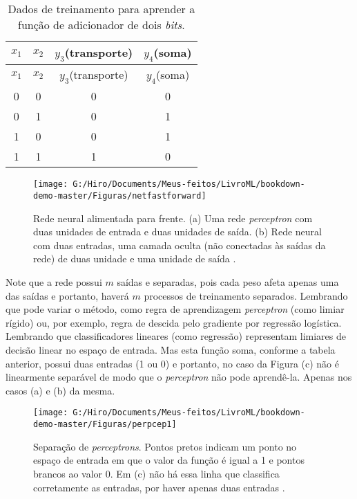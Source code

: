 \documentclass[
  openany]{book}
\begin{document}
\begin{longtable}[]{@{}cccc@{}}
\caption{\label{tab:tabredepercep} Dados de treinamento para aprender a função de adicionador de dois \emph{bits}.}\tabularnewline
\toprule
\(x_1\) & \(x_2\) & \(y_3\)(transporte) & \(y_4\)(soma)\tabularnewline
\midrule
\endfirsthead
\toprule
\(x_1\) & \(x_2\) & \(y_3\)(transporte) & \(y_4\)(soma)\tabularnewline
\midrule
\endhead
0 & 0 & 0 & 0\tabularnewline
0 & 1 & 0 & 1\tabularnewline
1 & 0 & 0 & 1\tabularnewline
1 & 1 & 1 & 0\tabularnewline
\bottomrule
\end{longtable}

\begin{figure}

{\centering \texttt{[image: G:/Hiro/Documents/Meus-feitos/LivroML/bookdown-demo-master/Figuras/netfastforward]} 

}

\caption{Rede neural alimentada para frente. (a) Uma rede \emph{perceptron} com duas unidades de entrada e duas unidades de saída. (b) Rede neural com duas entradas, uma camada oculta (não conectadas às saídas da rede) de duas unidade e uma unidade de saída \citep{russel2004inteligencia}.}\label{fig:netfastforward}
\end{figure}



Note que a rede possui \(m\) saídas e separadas, pois cada peso afeta apenas uma das saídas e portanto, haverá \(m\) processos de treinamento separados. Lembrando que pode variar o método, como regra de aprendizagem \emph{perceptron} (como limiar rígido) ou, por exemplo, regra de descida pelo gradiente por regressão logística. Lembrando que classificadores lineares (como regressão) representam limiares de decisão linear no espaço de entrada. Mas esta função soma, conforme a tabela anterior, possui duas entradas (1 ou 0) e portanto, no caso da Figura (c) não é linearmente separável de modo que o \emph{perceptron} não pode aprendê-la. Apenas nos casos (a) e (b) da mesma.

\begin{figure}

{\centering \texttt{[image: G:/Hiro/Documents/Meus-feitos/LivroML/bookdown-demo-master/Figuras/perpcep1]} 

}

\caption{Separação de \emph{perceptrons}. Pontos pretos indicam um ponto no espaço de entrada em que o valor da função é igual a 1 e pontos brancos ao valor 0. Em (c) não há essa linha que classifica corretamente as entradas, por haver apenas duas entradas \citep{russel2004inteligencia}.}\label{fig:perpcep1}
\end{figure}
\end{document}
